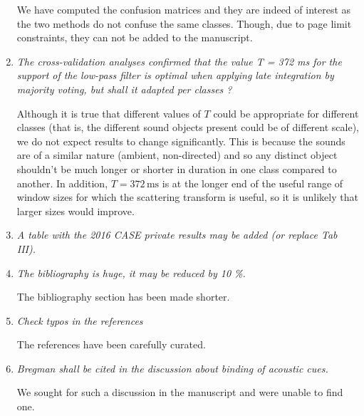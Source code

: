 \documentclass[10pt]{article}
\begin{document}
\begin{enumerate}
We have computed the confusion matrices and they are indeed of interest as the two methods do not confuse the same classes. Though, due to page limit constraints, they can not be added to the manuscript.


\item \emph{The cross-validation analyses confirmed that the value T = 372 ms for the support of the low-pass filter is optimal when applying late integration by majority voting, but shall it adapted per classes  ?}

Although it is true that different values of $T$ could be appropriate for different classes (that is, the different sound objects present could be of different scale), we do not expect results to change significantly. This is because the sounds are of a similar nature (ambient, non-directed) and so any distinct object shouldn't be much longer or shorter in duration in one class compared to another. In addition, $T = 372\,\mathrm{ms}$ is at the longer end of the useful range of window sizes for which the scattering transform is useful, so it is unlikely that larger sizes would improve.

\item \emph{A table with the 2016 CASE private results may be added (or replace Tab III).}

\item \emph{The bibliography is huge, it may be reduced by 10 \%.}

The bibliography section has been made shorter. 

\item \emph{Check typos in the references}

The references have been carefully curated.

\item \emph{Bregman shall be cited in the discussion about  binding of acoustic cues.}

We sought for such a discussion in the manuscript and were unable to find one.

\end{enumerate}
\end{document}
